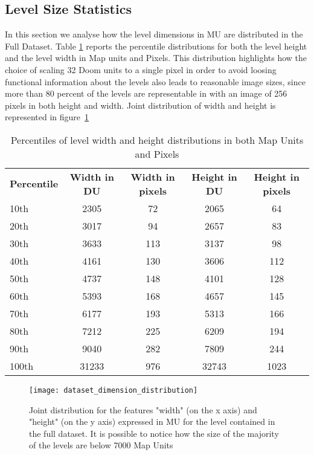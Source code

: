 \subsection{Level Size Statistics}
In this section we analyse how the level dimensions in \gls{MU} are distributed in the Full Dataset. Table \ref{tab:sizepercentiles} reports the percentile distributions for both the level height and the level width in Map units and Pixels. This distribution highlights how the choice of scaling 32 Doom units to a single pixel in order to avoid loosing functional information about the levels also leads to reasonable image sizes, since more than 80 percent of the levels are representable in with an image of 256 pixels in both height and width. Joint distribution of width and height is represented in figure~\ref{fig:sizedistribution}

\begin{table}[h!]
	\begin{tabularx}{\textwidth}{| X | c | c | c | c |}
		\cline{0-4}
		\textbf{Percentile} &  \textbf{Width in DU} & \textbf{Width in pixels} &\textbf{ Height in DU} & \textbf{Height in pixels} \\
		\cline{0-4}
		10th & 2305 & 72 & 2065 & 64 \\  
		20th & 3017 & 94 & 2657 & 83 \\  
		30th & 3633 & 113 & 3137 & 98 \\  
		40th & 4161 & 130 & 3606 & 112 \\  
		50th & 4737 & 148 & 4101 & 128 \\  
		60th & 5393 & 168 & 4657 & 145 \\  
		70th & 6177 & 193 & 5313 & 166 \\  
		80th & 7212 & 225 & 6209 & 194 \\  
		90th & 9040 & 282 & 7809 & 244 \\
		100th & 31233 & 976 & 32743 & 1023 \\   
		\cline{0-4}
\end{tabularx}
\caption[ Percentiles of level width and height distributions ]{  Percentiles of level width and height distributions in both Map Units and Pixels }
\label{tab:sizepercentiles}
\end{table}	


\begin{figure}[h!]
	\begin{center}
		\texttt{[image: dataset\_dimension\_distribution]}
	\end{center}
	
	\captionsetup{width=0.8\linewidth}
	\caption[DoomDataset Size distribution]{Joint distribution for the features "width" (on the x axis) and "height" (on the y axis) expressed in \gls{MU} for the level contained in the full dataset. It is possible to notice how the size of the majority of the levels are below 7000 Map Units   }
	\label{fig:sizedistribution}
	\medskip
	
\end{figure}

